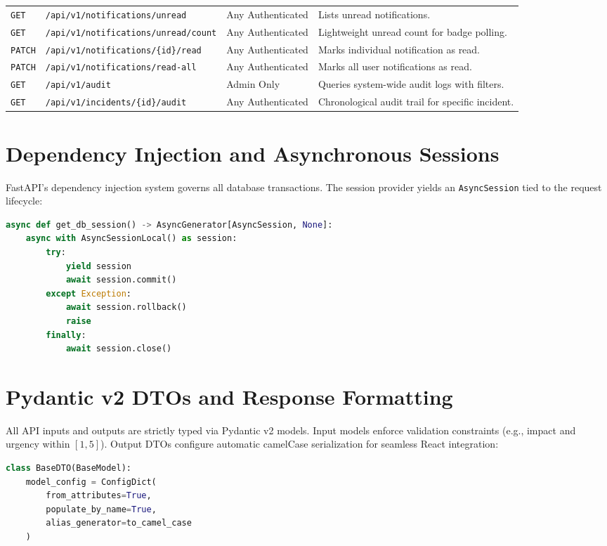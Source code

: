 \documentclass[11pt,a4paper,oneside]{report}
\begin{document}
\begin{table}[H]
\begin{tabular}{p{1.2cm}p{5.5cm}p{2.5cm}p{5.0cm}}
\texttt{GET} & \texttt{/api/v1/notifications/unread} & Any Authenticated & Lists unread notifications. \\
\texttt{GET} & \texttt{/api/v1/notifications/unread/count}& Any Authenticated & Lightweight unread count for badge polling. \\
\texttt{PATCH} & \texttt{/api/v1/notifications/\{id\}/read} & Any Authenticated & Marks individual notification as read. \\
\texttt{PATCH} & \texttt{/api/v1/notifications/read-all} & Any Authenticated & Marks all user notifications as read. \\
\texttt{GET} & \texttt{/api/v1/audit} & Admin Only & Queries system-wide audit logs with filters. \\
\texttt{GET} & \texttt{/api/v1/incidents/\{id\}/audit} & Any Authenticated & Chronological audit trail for specific incident. \\
\bottomrule
\end{tabular}
\end{table}

\section{Dependency Injection and Asynchronous Sessions}
\label{sec:backend_di}
FastAPI's dependency injection system governs all database transactions. The session provider yields an \texttt{AsyncSession} tied to the request lifecycle:
\begin{lstlisting}[language=Python, caption={Per-Request Async Database Session Provider}]
async def get_db_session() -> AsyncGenerator[AsyncSession, None]:
    async with AsyncSessionLocal() as session:
        try:
            yield session
            await session.commit()
        except Exception:
            await session.rollback()
            raise
        finally:
            await session.close()
\end{lstlisting}

\section{Pydantic v2 DTOs and Response Formatting}
\label{sec:backend_dto}
All API inputs and outputs are strictly typed via Pydantic v2 models. Input models enforce validation constraints (e.g., impact and urgency within $[1, 5]$). Output DTOs configure automatic camelCase serialization for seamless React integration:
\begin{lstlisting}[language=Python, caption={Pydantic DTO Configuration with CamelCase Aliasing}]
class BaseDTO(BaseModel):
    model_config = ConfigDict(
        from_attributes=True,
        populate_by_name=True,
        alias_generator=to_camel_case
    )
\end{lstlisting}
\end{document}
